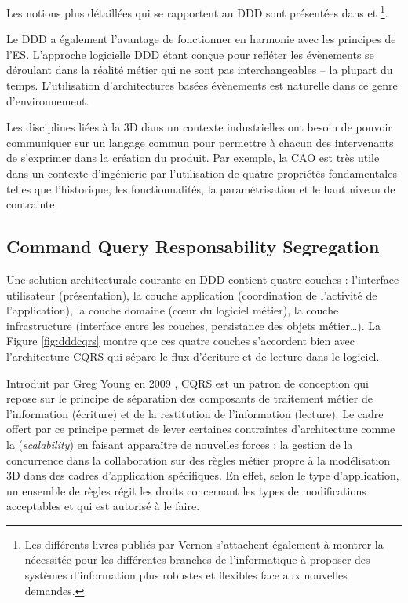 Les notions plus détaillées qui se rapportent au \gls{DDD} sont présentées dans 
\cite{Evans2003} et \cite{Vernon2013}\footnote{Les différents livres publiés par 
Vernon s'attachent également à montrer la nécessitée pour les différentes 
branches de l'informatique à proposer des 
systèmes d'information plus robustes et flexibles face aux nouvelles demandes.}.

Le \gls{DDD} a également l'avantage de fonctionner en harmonie avec les 
principes de l'\gls{ES}. L'approche logicielle \gls{DDD} étant conçue pour refléter 
les évènements se déroulant dans la réalité métier qui ne sont pas 
interchangeables -- la plupart du temps. L'utilisation d'architectures 
basées évènements est naturelle dans ce genre d'environnement. 

Les disciplines liées à la 3D dans un contexte industrielles ont besoin de pouvoir 
communiquer sur un langage commun pour permettre à chacun des 
intervenants de s'exprimer dans la création du produit. Par exemple, la \gls{CAO} 
est très utile dans un contexte d'ingénierie par l'utilisation de quatre propriétés 
fondamentales telles que l'historique, les fonctionnalités, la paramétrisation et le 
haut niveau de contrainte.



\subsection{Command Query Responsability Segregation}
\label{sec:CQRS}
Une solution architecturale courante en \gls{DDD} contient quatre 
couches : l'interface utilisateur (présentation), la couche application (coordination 
de l'activité de l'application), la couche domaine (c\oe ur du logiciel métier), la 
couche infrastructure (interface entre les couches, persistance des objets 
métier\dots). La Figure \ref{fig:dddcqrs} montre que ces quatre couches s'accordent
bien avec l'architecture \gls{CQRS} qui sépare le flux d'écriture et de lecture dans 
le logiciel.

Introduit par Greg Young en 2009 \cite{Young2009}, \gls{CQRS} est un patron de 
conception qui repose sur le principe de séparation des composants de traitement 
métier de l'information (écriture) et de la restitution de l'information (lecture). Le 
cadre offert par ce principe permet de lever certaines contraintes d'architecture 
comme la (\textit{scalability}) en faisant apparaître de nouvelles forces : la gestion 
de la concurrence dans la collaboration sur des règles métier propre à la 
modélisation 3D dans des cadres d'application spécifiques. En effet, selon le type 
d'application, un ensemble de règles régit les droits concernant les types de 
modifications acceptables et qui est autorisé à le faire.

